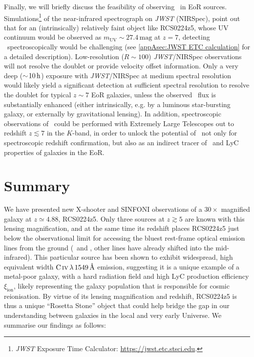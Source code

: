Finally, we will briefly discuss the feasibility of observing \MgII\ in EoR sources. Simulations\footnote{\textit{JWST} Exposure Time Calculator: \url{https://jwst.etc.stsci.edu}.} of the near-infrared spectrograph on \textit{JWST} (NIRSpec), point out that for an (intrinsically) relatively faint object like RCS0224z5, whose UV continuum would be observed as $m_\text{UV} \sim 27.4 \, \mathrm{mag}$ at $z = 7$, detecting \MgII\ spectroscopically would be challenging (see \cref{appAsec:JWST ETC calculation} for a detailed description). Low-resolution ($R \sim 100$) \textit{JWST}/NIRSpec observations will not resolve the doublet or provide velocity offset information. Only a very deep ($\sim \! 10 \, \mathrm{h}$) exposure with \textit{JWST}/NIRSpec at medium spectral resolution would likely yield a significant detection at sufficient spectral resolution to resolve the doublet for typical $z \sim 7$ EoR galaxies, unless the observed \MgII\ flux is substantially enhanced (either intrinsically, e.g. by a luminous star-bursting galaxy, or externally by gravitational lensing). In addition, spectroscopic observations of \MgII\ could be performed with Extremely Large Telescopes out to redshift $z \lesssim 7$ in the $K$-band, in order to unlock the potential of \MgII\ not only for spectroscopic redshift confirmation, but also as an indirect tracer of \lya\ and LyC properties of galaxies in the EoR.

\section{Summary}
\label{chAsec:Summary}

We have presented new X-shooter and SINFONI observations of a $30 \times$ magnified galaxy at $z \simeq 4.88$, RCS0224z5. Only three sources at $z \gtrsim 5$ are known with this lensing magnification, and at the same time its redshift places RCS0224z5 just below the observational limit for accessing the bluest rest-frame optical emission lines from the ground (\OII\ and \NeIII, other lines have already shifted into the mid-infrared). This particular source has been shown to exhibit widespread, high equivalent width $\CIV \, \lambda \, 1549 \, \Angstrom$ emission, suggesting it is a unique example of a metal-poor galaxy, with a hard radiation field and high LyC production efficiency $\xi_\text{ion}$, likely representing the galaxy population that is responsible for cosmic reionisation. By virtue of its lensing magnification and redshift, RCS0224z5 is thus a unique ``Rosetta Stone'' object that could help bridge the gap in our understanding between galaxies in the local and very early Universe. We summarise our findings as follows:


